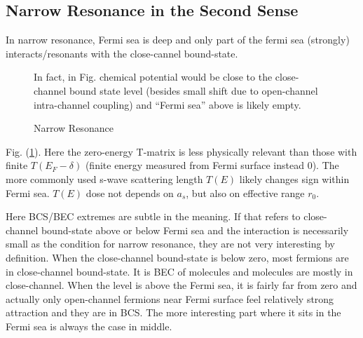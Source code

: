 \subsection{Narrow Resonance in the Second Sense}
In narrow resonance, Fermi sea is deep and only part of the fermi sea (strongly) interacts/resonants with the close-cannel bound-state.   
\begin{figure}[hhtb]
	\centering
	         \quad
		\quad
	{\caption{Narrow Resonance\label{fig:narrowFR}}
	\parbox{0.7\textwidth}{\small{In fact, in Fig.  chemical potential would be close to the close-channel bound state level (besides small shift due to open-channel intra-channel coupling) and ``Fermi sea'' above is likely empty. }}}
\end{figure}
Fig. (\ref{fig:narrowFR}).  Here the zero-energy T-matrix is less  physically relevant than those with finite $T(E_{F}-\delta)$ (finite energy measured from Fermi surface instead 0).  The more commonly used s-wave scattering length $T(E)$ likely changes sign within Fermi sea.  $T(E)$ dose not depends on $a_{s}$, but also on effective range $r_{0}$.  

Here BCS/BEC extremes are subtle in the meaning.  If that refers to close-channel bound-state above or below Fermi sea and the interaction is necessarily small as the condition for narrow resonance, they are not very interesting by definition.  When the close-channel bound-state is below zero, most fermions are in close-channel bound-state.  It is BEC of molecules and molecules are mostly in close-channel. When the level is above the Fermi sea, it is fairly far from zero and actually only open-channel fermions near Fermi surface feel relatively strong attraction and they are in BCS.  The more interesting part where it sits in the Fermi sea is always the  case in middle.  

